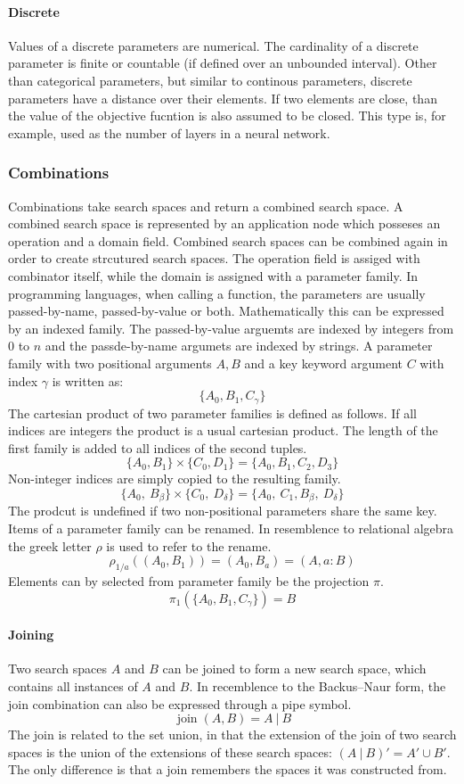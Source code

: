 \documentclass[english]{article}
\begin{document}
\paragraph{Discrete}
Values of a discrete parameters are numerical. The cardinality of a discrete parameter is finite or countable (if defined over an unbounded interval).
Other than categorical parameters, but similar to continous parameters, discrete parameters have a distance over their elements. If two elements are close, than the value of the objective fucntion is also assumed to be closed. This type is, for example, used as the number of layers in a neural network.

\subsubsection{Combinations}
Combinations take search spaces and return a combined search space. A combined search space is represented by an application node which posseses an operation and a domain field. Combined search spaces can be combined again in order to create strcutured search spaces. The operation field is assiged with combinator itself, while the domain is assigned with a parameter family.
In programming languages, when calling a function, the parameters are usually passed-by-name, passed-by-value or both. Mathematically this can be expressed by an indexed family. The passed-by-value arguemts are indexed by integers from $0$ to $n$ and the passde-by-name argumets are indexed by strings. A parameter family with two positional arguments $A,B$ and a key keyword argument $C$ with index $\gamma$ is written as:
$$\{A_0, B_1, C_\gamma\}$$
The cartesian product of two parameter families is defined as follows. If all indices are integers the product is a usual cartesian product. The length of the first family is added to all indices of the second tuples.
$$\{A_0, B_1\} \times \{C_0, D_1\} = \{A_0, B_1, C_2, D_3\}$$
Non-integer indices are simply copied to the resulting family.
$$\{A_0,\ B_\beta\} \times \{C_0,\ D_\delta\} = \{A_0,\ C_1, B_\beta,\ D_\delta\}$$
The prodcut is undefined if two non-positional parameters share the same key.
Items of a parameter family can be renamed. In resemblence to relational algebra the greek letter $\rho$ is used to refer to the rename.
$$\rho_{1/a}((A_{0}, B_{1})) = (A_{0}, B_{a}) = (A, a:B)$$
Elements can by selected from parameter family be the projection $\pi$.
$$\pi_1(\{A_0, B_1, C_\gamma\}) = B$$

\paragraph{Joining}
Two search spaces $A$ and $B$ can be joined to form a new search space, which contains all instances of $A$ and $B$. In recemblence to the Backus–Naur form, the join combination can also be expressed through a pipe symbol.
$$ \operatorname{join}(A, B) = A\ |\ B $$
The join is related to the set union, in that the extension of the join of two search spaces is the union of the extensions of these search spaces: $(A\ |\ B)' = A' \cup B'$. The only difference is that a join remembers the spaces it was constructed from.
\end{document}

